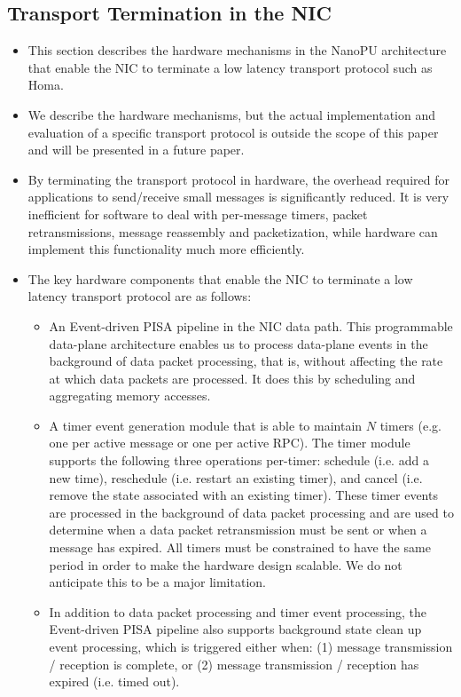 \subsection{Transport Termination in the NIC}
\begin{itemize}
    \item This section describes the hardware mechanisms in the NanoPU architecture that enable the NIC to terminate a low latency transport protocol such as Homa.
    \item We describe the hardware mechanisms, but the actual implementation and evaluation of a specific transport protocol is outside the scope of this paper and will be presented in a future paper.
    \item By terminating the transport protocol in hardware, the overhead required for applications to send/receive small messages is significantly reduced. It is very inefficient for software to deal with per-message timers, packet retransmissions, message reassembly and packetization, while hardware can implement this functionality much more efficiently.
    \item The key hardware components that enable the NIC to terminate a low latency transport protocol are as follows:
    \begin{itemize}
        \item An Event-driven PISA pipeline in the NIC data path. This programmable data-plane architecture enables us to process data-plane events in the background of data packet processing, that is, without affecting the rate at which data packets are processed. It does this by scheduling and aggregating memory accesses.
        \item A timer event generation module that is able to maintain $N$ timers (e.g. one per active message or one per active RPC). The timer module supports the following three operations per-timer: schedule (i.e. add a new time), reschedule (i.e. restart an existing timer), and cancel (i.e. remove the state associated with an existing timer). These timer events are processed in the background of data packet processing and are used to determine when a data packet retransmission must be sent or when a message has expired. All timers must be constrained to have the same period in order to make the hardware design scalable. We do not anticipate this to be a major limitation.
        \item In addition to data packet processing and timer event processing, the Event-driven PISA pipeline also supports background state clean up event processing, which is triggered either when: (1) message transmission / reception is complete, or (2) message transmission / reception has expired (i.e. timed out).

\end{itemize}
\end{itemize}
